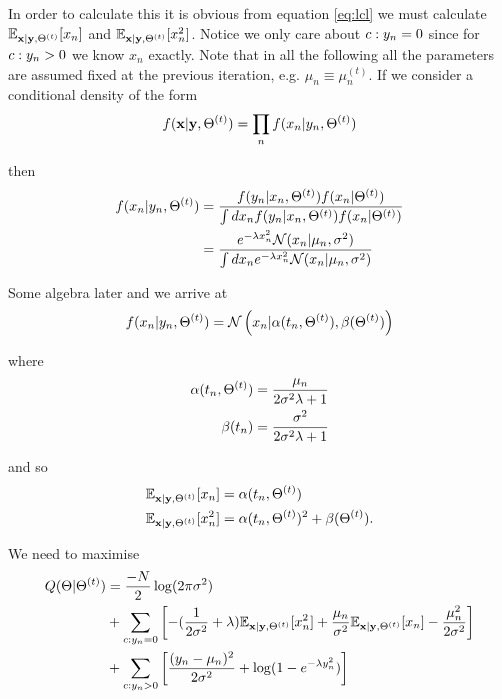 In order to calculate this it is obvious from equation \ref{eq:lcl} we must calculate $\mathbb{E}_{{\bf x} | {\bf y}, \Theta^{(t)}} [ x_n ]$ and $\mathbb{E}_{{\bf x} | {\bf y}, \Theta^{(t)}} [ x_n^2 ]$. Notice we only care about ${c: y_n = 0}$ since for ${c: y_n > 0}$ we know $x_n$ exactly. Note that in all the following all the parameters are assumed fixed at the previous iteration, e.g. $\mu_n \equiv \mu_n^{(t)}$. If we consider a conditional density of the form
\begin{equation}
f({\bf x} | {\bf y}, \Theta^{(t)}) = \prod_n f(x_n | y_n, \Theta^{(t)})
\end{equation}

then
\begin{equation}
\begin{aligned}
f(x_n | y_n, \Theta^{(t)}) & = \frac{f(y_n | x_n, \Theta^{(t)})f(x_n | \Theta^{(t)})}{\int dx_n f(y_n | x_n, \Theta^{(t)})f(x_n | \Theta^{(t)})} \\
& = \frac{e^{-\lambda x_n^2} \mathcal{N}(x_n | \mu_n, \sigma^2)}{\int dx_n e^{-\lambda x_n^2} \mathcal{N}(x_n | \mu_n, \sigma^2)}
\end{aligned}
\end{equation}


Some algebra later and we arrive at
\begin{equation}
f(x_n | y_n, \Theta^{(t)}) = \mathcal{N}\left(x_n | \alpha(t_n, \Theta^{(t)}), \beta(\Theta^{(t)}) \right)
\end{equation}

where
\begin{equation}
\begin{aligned}
\alpha(t_n, \Theta^{(t)}) & = \frac{\mu_n}{2 \sigma^2 \lambda + 1} \\
\beta(t_n) & = \frac{\sigma^2}{2 \sigma^2 \lambda + 1}
\end{aligned}
\end{equation}

and so
\begin{equation}
\begin{aligned}
\mathbb{E}_{{\bf x} | {\bf y}, \Theta^{(t)}} [ x_n ] &= \alpha(t_n, \Theta^{(t)})  \\
\mathbb{E}_{{\bf x} | {\bf y}, \Theta^{(t)}} [ x_n^2  ] &= \alpha(t_n, \Theta^{(t)})^2 + \beta(\Theta^{(t)}).
\end{aligned}
\end{equation}

We need to maximise
\begin{equation}
\begin{aligned}
Q(\Theta | \Theta^{(t)}) &= \frac{-N}{2} \log(2 \pi \sigma^2) \\
& +
\sum_{c: y_n = 0} \left[ -(\frac{1}{2\sigma^2} + \lambda) \mathbb{E}_{{\bf x} | {\bf y}, \Theta^{(t)}} [ x_n^2 ] + \frac{\mu_n}{\sigma^2} \mathbb{E}_{{\bf x} | {\bf y}, \Theta^{(t)}} [ x_n ] - \frac{\mu_n^2}{2\sigma^2}\right] \\
& +
\sum_{c: y_n > 0} \left[ \frac{(y_n - \mu_n)^2}{2 \sigma^2} + \log(1 - e^{-\lambda y_n^2}) \right]
\end{aligned}
\end{equation}

